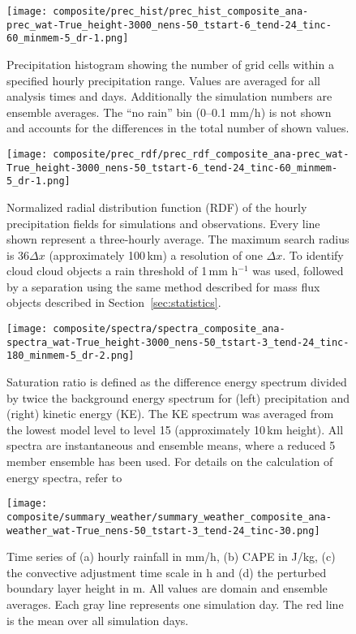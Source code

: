 \documentclass[a4paper, 12pt]{article}
\begin{document}
\begin{figure}[h!]
\noindent \centering
\texttt{[image: composite/prec\_hist/prec\_hist\_composite\_ana-prec\_wat-True\_height-3000\_nens-50\_tstart-6\_tend-24\_tinc-60\_minmem-5\_dr-1.png]}\\
\caption{Precipitation histogram showing the number of grid cells within a specified hourly precipitation range. Values are averaged for all analysis times and days. Additionally the simulation numbers are ensemble averages. The ``no rain'' bin (0--0.1 mm/h) is not shown and accounts for the differences in the total number of shown values.} \label{fig:prec_hist}
\end{figure}

\begin{figure}[h!]
\noindent \centering
\texttt{[image: composite/prec\_rdf/prec\_rdf\_composite\_ana-prec\_wat-True\_height-3000\_nens-50\_tstart-6\_tend-24\_tinc-60\_minmem-5\_dr-1.png]}\\
\caption{Normalized radial distribution function (RDF) of the hourly precipitation fields for simulations and observations. Every line shown represent a three-hourly average. The maximum search radius is 36$\Delta x$ (approximately 100\,km) a resolution of one $\Delta x$. To identify cloud cloud objects a rain threshold of 1\,mm h$^{-1}$ was used, followed by a separation using the same method described for mass flux objects described in Section~\ref{sec:statistics}.} \label{fig:prec_rdf}
\end{figure}

\begin{figure}[h!]
\noindent \centering
\texttt{[image: composite/spectra/spectra\_composite\_ana-spectra\_wat-True\_height-3000\_nens-50\_tstart-3\_tend-24\_tinc-180\_minmem-5\_dr-2.png]}\\
\caption{Saturation ratio is defined as the difference energy spectrum divided by twice the background energy spectrum for (left) precipitation and (right) kinetic energy (KE). The KE spectrum was averaged from the lowest model level to level 15 (approximately 10\,km height). All spectra are instantaneous and ensemble means, where a reduced 5 member ensemble has been used. For details on the calculation of energy spectra, refer to \cite{Selz2015b}} \label{fig:spectra}
\end{figure}

\begin{figure}[h!]
\noindent \centering
\texttt{[image: composite/summary\_weather/summary\_weather\_composite\_ana-weather\_wat-True\_nens-50\_tstart-3\_tend-24\_tinc-30.png]}\\
\caption{Time series of (a) hourly rainfall in mm/h, (b) CAPE in J/kg, (c) the convective adjustment time scale in h and (d) the perturbed boundary layer height in m. All values are domain and ensemble averages. Each gray line represents one simulation day. The red line is the mean over all simulation days.} \label{fig:summary_weather}
\end{figure}
\end{document}
